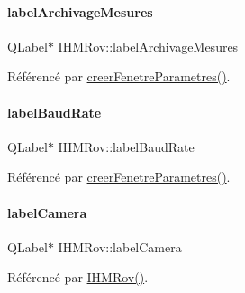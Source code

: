 \mbox{\label{class_i_h_m_rov_a58e157352986f690bca4b79b9b05ee1d}} 
\paragraph{\texorpdfstring{label\+Archivage\+Mesures}{labelArchivageMesures}}
{\footnotesize\ttfamily Q\+Label$\ast$ I\+H\+M\+Rov\+::label\+Archivage\+Mesures\hspace{0.3cm}{\ttfamily [private]}}



Référencé par \hyperlink{class_i_h_m_rov_aed451139ac09ef18b7c92637761d80ce}{creer\+Fenetre\+Parametres()}.

\mbox{\label{class_i_h_m_rov_a6e9a97a5cd38bfd92e6114c4299be7ee}} 
\paragraph{\texorpdfstring{label\+Baud\+Rate}{labelBaudRate}}
{\footnotesize\ttfamily Q\+Label$\ast$ I\+H\+M\+Rov\+::label\+Baud\+Rate\hspace{0.3cm}{\ttfamily [private]}}



Référencé par \hyperlink{class_i_h_m_rov_aed451139ac09ef18b7c92637761d80ce}{creer\+Fenetre\+Parametres()}.

\mbox{\label{class_i_h_m_rov_a01cfcfe3e5744cd977bb0416d4e3debe}} 
\paragraph{\texorpdfstring{label\+Camera}{labelCamera}}
{\footnotesize\ttfamily Q\+Label$\ast$ I\+H\+M\+Rov\+::label\+Camera\hspace{0.3cm}{\ttfamily [private]}}



Référencé par \hyperlink{class_i_h_m_rov_a5dac1fb4612866cc61f699a415e0ef6b}{I\+H\+M\+Rov()}.

